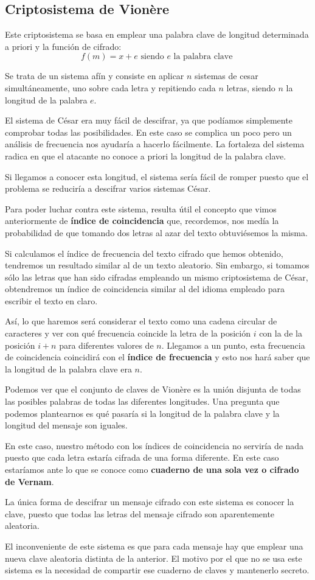 \subsection{Criptosistema de Vionère}
Este criptosistema se basa en emplear una palabra clave de longitud determinada a priori y la función de cifrado:
\[f(m)=x+e \text{ siendo } e \text{ la palabra clave }\]

Se trata de un sistema afín y consiste en aplicar $n$ sistemas de cesar simultáneamente, uno sobre cada letra y repitiendo cada $n$ letras, siendo $n$ la longitud de la palabra $e$.

El sistema de César era muy fácil de descifrar, ya que podíamos simplemente comprobar todas las posibilidades. En este caso se complica un poco pero un análisis de frecuencia nos ayudaría a hacerlo fácilmente. La fortaleza del sistema radica en que el atacante no conoce a priori la longitud de la palabra clave.

Si llegamos a conocer esta longitud, el sistema sería fácil de romper puesto que el problema se reduciría a descifrar varios sistemas César.

Para poder luchar contra este sistema, resulta útil el concepto que vimos anteriormente de \textbf{índice de coincidencia} que, recordemos, nos medía la probabilidad de que tomando dos letras al azar del texto obtuviésemos la misma.


Si calculamos el índice de frecuencia del texto cifrado que hemos obtenido, tendremos un resultado similar al de un texto aleatorio. Sin embargo, si tomamos sólo las letras que han sido cifradas empleando un mismo criptosistema de César, obtendremos un índice de coincidencia similar al del idioma empleado para escribir el texto en claro.

Así, lo que haremos será considerar el texto como una cadena circular de caracteres y ver con qué frecuencia coincide la letra de la posición $i$ con la de la posición $i+n$ para diferentes valores de $n$. Llegamos a un punto, esta frecuencia de coincidencia coincidirá con el \textbf{índice de frecuencia} y esto nos hará saber que la longitud de la palabra clave era $n$.

Podemos ver que el conjunto de claves de Vionère es la unión disjunta de todas las posibles palabras de todas las diferentes longitudes. Una pregunta que podemos plantearnos es qué pasaría si la longitud de la palabra clave y la longitud del mensaje son iguales.

En este caso, nuestro método con los índices de coincidencia no serviría de nada puesto que cada letra estaría cifrada de una forma diferente. En este caso estaríamos ante lo que se conoce como \textbf{cuaderno de una sola vez o cifrado de Vernam}.

La única forma de descifrar un mensaje cifrado con este sistema es conocer la clave, puesto que todas las letras del mensaje cifrado son aparentemente aleatoria.

El inconveniente de este sistema es que para cada mensaje hay que emplear una nueva clave aleatoria distinta de la anterior. El motivo por el que no se usa este sistema es la necesidad de compartir ese cuaderno de claves y mantenerlo secreto.

